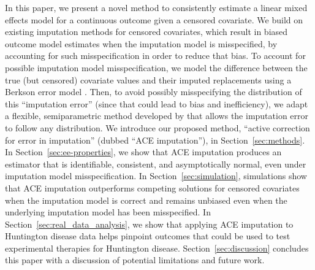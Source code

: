 \documentclass[12pt]{article}
\begin{document}
In this paper, we present a novel method to consistently estimate a linear mixed effects model for a continuous outcome given a censored covariate. We build on existing imputation methods for censored covariates, which result in biased outcome model estimates when the imputation model is misspecified, by accounting for such misspecification in order to reduce that bias.
To account for possible imputation model misspecification, we model the difference between the true (but censored) covariate values and their imputed replacements using a Berkson error model \citep{Carrolletal2006}. Then, to avoid possibly misspecifying the distribution of this ``imputation error'' (since that could lead to bias and inefficiency), we adapt a flexible, semiparametric method developed by \cite{garcia2016optimal} that allows the imputation error to follow any distribution. 
We introduce our proposed method, ``active correction for error in imputation'' (dubbed ``ACE imputation''), in Section~\ref{sec:methods}.  
In Section~\ref{sec:ee-properties}, we show that ACE imputation produces an estimator that is identifiable, consistent, and asymptotically normal, even under imputation model misspecification.
In  Section~\ref{sec:simulation}, simulations show that ACE imputation outperforms competing solutions for censored covariates when the imputation model is correct and remains unbiased even when the underlying imputation model has been misspecified. 
In Section~\ref{sec:real_data_analysis}, we show that applying ACE imputation to Huntington disease data %
helps pinpoint outcomes %
that could be used to test experimental therapies for Huntington disease. Section~\ref{sec:discussion} concludes this paper with a discussion of potential limitations and future work.
\end{document}
